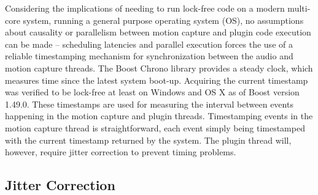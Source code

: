 Considering the implications of needing to run lock-free code on
a modern multi-core system, running a general purpose
operating system (OS),
no assumptions about causality or parallelism between
motion capture and plugin code execution can be made --
scheduling latencies and parallel execution forces the use
of a reliable timestamping mechanism for synchronization between
the audio and motion capture threads.
The Boost Chrono library provides a steady clock,
which measures time since the latest system boot-up.
Acquiring the current timestamp was verified to be lock-free
at least on Windows and OS X as of Boost version 1.49.0.
These timestamps are used for measuring the interval between
events happening in the motion capture and plugin threads.
Timestamping events in the motion capture thread is straightforward,
each event simply being timestamped with
the current timestamp returned by the system.
The plugin thread will, however,
require jitter correction to prevent timing problems.

\subsection{Jitter Correction}

